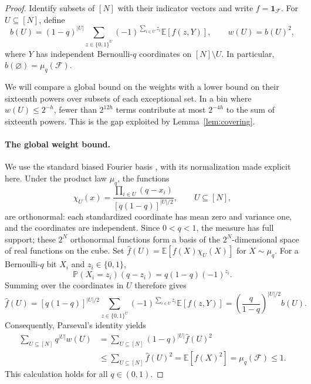 \begin{proof}
Identify subsets of $[N]$ with their indicator vectors and write
$f=\mathbf 1_{\mathcal F}$. For $U\subseteq[N]$, define
\begin{equation}\label{eq:weights-definition}
 b(U)=(1-q)^{|U|}
 \sum_{z\in\{0,1\}^{U}}(-1)^{\sum_{i\in U}z_i}
 \mathbb E[f(z,Y)],
 \qquad w(U)=b(U)^2,
\end{equation}
where $Y$ has independent Bernoulli-$q$ coordinates on $[N]\setminus U$.
In particular, $b(\varnothing)=\mu_q(\mathcal F)$.

We will compare a global bound on the weights with a lower bound on
their sixteenth powers over subsets of each exceptional set.
In a bin where $w(U)\le2^{-h}$, fewer than $2^{12h}$ terms contribute
at most $2^{-4h}$ to the sum of sixteenth powers. This is the gap
exploited by Lemma~\ref{lem:covering}.

\paragraph{The global weight bound.}
We use the standard biased Fourier basis
\cite[Section~8.4]{ODonnell14}, with its normalization made explicit here.
Under the product law $\mu_q$, the functions
\[
 \chi_U(x)=\frac{\prod_{i\in U}(q-x_i)}{[q(1-q)]^{|U|/2}},
 \qquad U\subseteq[N],
\]
are orthonormal: each standardized coordinate has mean zero
and variance one, and the coordinates are independent. Since $0<q<1$, the measure has
full support; these $2^N$ orthonormal functions form a basis of the
$2^N$-dimensional space of real functions on the cube. Set
$\widehat f(U)=\mathbb E[f(X)\chi_U(X)]$ for $X\sim\mu_q$.
For a Bernoulli-$q$ bit $X_i$ and $z_i\in\{0,1\}$,
\[
 \mathbb P(X_i=z_i)(q-z_i)=q(1-q)(-1)^{z_i}.
\]
Summing over the coordinates in $U$ therefore gives
\[
 \widehat f(U)
 =[q(1-q)]^{|U|/2}
 \sum_{z\in\{0,1\}^{U}}(-1)^{\sum_{i\in U}z_i}
 \mathbb E[f(z,Y)]
 =\left(\frac{q}{1-q}\right)^{|U|/2}b(U).
\]
Consequently, Parseval's identity yields
\begin{equation}\label{eq:global-weight-bound}
 \begin{aligned}
 \sum_{U\subseteq[N]}q^{|U|}w(U)
 &=\sum_{U\subseteq[N]}(1-q)^{|U|}\widehat f(U)^2\\
 &\le\sum_{U\subseteq[N]}\widehat f(U)^2
 =\mathbb E[f(X)^2]
 =\mu_q(\mathcal F)\le1.
 \end{aligned}
\end{equation}
This calculation holds for all $q\in(0,1)$.


\end{proof}
